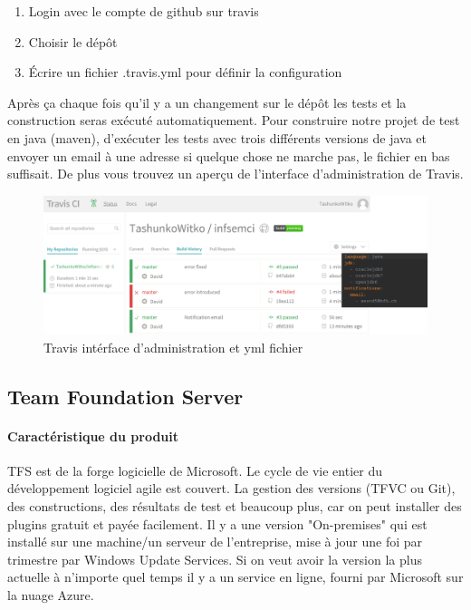 \begin{enumerate}
	\item Login avec le compte de github sur travis
	\item Choisir le dépôt
	\item Écrire un fichier .travis.yml pour définir la configuration
\end{enumerate}

Après ça chaque fois qu'il y a un changement sur le dépôt les tests et la construction seras exécuté automatiquement. Pour construire notre projet de test en java (maven), d'exécuter les tests avec trois différents versions de java et envoyer un email à une adresse si quelque chose ne marche pas, le fichier en bas suffisait. De plus vous trouvez un aperçu de l'interface d'administration de Travis.

\begin{figure}[H]
	\centering
		\includegraphics[scale=0.2]{bilder/travisciymlfile}
	\caption{Travis intérface d'administration et yml fichier}
	\label{fig:travisgui}
\end{figure}
\clearpage



\subsection{Team Foundation Server}
\paragraph{Caractéristique du produit} TFS est de la forge logicielle de Microsoft. Le cycle de vie entier du développement logiciel agile est couvert. La gestion des versions (TFVC ou Git), des constructions, des résultats de test et beaucoup plus, car on peut installer des plugins gratuit et payée facilement. Il y a une version "On-premises" qui est installé sur une machine/un serveur de l'entreprise, mise à jour une foi par trimestre par Windows Update Services. Si on veut avoir la version la plus actuelle à n'importe quel temps il y a un service en ligne, fourni par Microsoft sur la nuage Azure.

